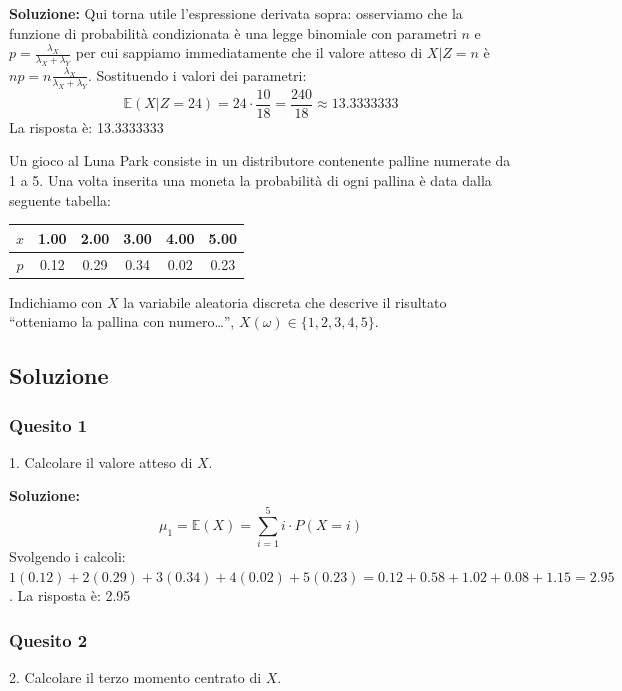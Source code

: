 \documentclass[12pt, a4paper]{article}
\begin{document}
\textbf{Soluzione:}
Qui torna utile l’espressione derivata sopra: osserviamo che la funzione di probabilità condizionata è una legge binomiale con parametri $n$ e $p = \frac{\lambda_X}{\lambda_X+\lambda_Y}$ per cui sappiamo immediatamente che il valore atteso di $X|Z=n$ è $np = n\frac{\lambda_X}{\lambda_X+\lambda_Y}$.
Sostituendo i valori dei parametri:
$$ \mathbb{E}(X|Z=24) = 24 \cdot \frac{10}{18} = \frac{240}{18} \approx 13.3333333 $$
La risposta è: 13.3333333


\vspace{0.5cm}
\begin{tcolorbox}[colback=lightergray!10, colframe=tocsec, title=\textbf{Esercizio 8}]
Un gioco al Luna Park consiste in un distributore contenente palline numerate da 1 a 5. Una volta inserita una moneta la probabilità di ogni pallina è data dalla seguente tabella:
\begin{center}
\begin{tabular}{c|ccccc}
\toprule
$x$ & 1.00 & 2.00 & 3.00 & 4.00 & 5.00 \\
\midrule
$p$ & 0.12 & 0.29 & 0.34 & 0.02 & 0.23 \\
\bottomrule
\end{tabular}
\end{center}
Indichiamo con $X$ la variabile aleatoria discreta che descrive il risultato ``otteniamo la pallina con numero\dots'', $X(\omega) \in \{1,2,3,4,5\}$.
\end{tcolorbox}

\subsection*{Soluzione}

\subsubsection*{Quesito 1}
1. Calcolare il valore atteso di $X$.

\textbf{Soluzione:}
$$ \mu_1 = \mathbb{E}(X) = \sum_{i=1}^5 i \cdot P(X=i) $$
Svolgendo i calcoli: $1(0.12) + 2(0.29) + 3(0.34) + 4(0.02) + 5(0.23) = 0.12 + 0.58 + 1.02 + 0.08 + 1.15 = 2.95$.
La risposta è: 2.95

\subsubsection*{Quesito 2}
2. Calcolare il terzo momento centrato di $X$.
\end{document}
